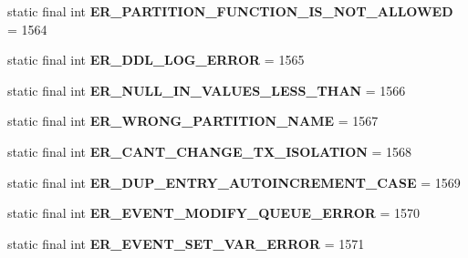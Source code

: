 \begin{DoxyCompactItemize}
static final int {\bfseries E\+R\+\_\+\+P\+A\+R\+T\+I\+T\+I\+O\+N\+\_\+\+F\+U\+N\+C\+T\+I\+O\+N\+\_\+\+I\+S\+\_\+\+N\+O\+T\+\_\+\+A\+L\+L\+O\+W\+ED} = 1564
\item 
\mbox{\label{classcom_1_1mysql_1_1jdbc_1_1_mysql_error_numbers_ae4eada3f8091c7c8cb28bda9799a93fe}} 
static final int {\bfseries E\+R\+\_\+\+D\+D\+L\+\_\+\+L\+O\+G\+\_\+\+E\+R\+R\+OR} = 1565
\item 
\mbox{\label{classcom_1_1mysql_1_1jdbc_1_1_mysql_error_numbers_a443c432772f886b0fbf8eeaf4c421483}} 
static final int {\bfseries E\+R\+\_\+\+N\+U\+L\+L\+\_\+\+I\+N\+\_\+\+V\+A\+L\+U\+E\+S\+\_\+\+L\+E\+S\+S\+\_\+\+T\+H\+AN} = 1566
\item 
\mbox{\label{classcom_1_1mysql_1_1jdbc_1_1_mysql_error_numbers_a599e0c2354340bb532eae2cf9669d602}} 
static final int {\bfseries E\+R\+\_\+\+W\+R\+O\+N\+G\+\_\+\+P\+A\+R\+T\+I\+T\+I\+O\+N\+\_\+\+N\+A\+ME} = 1567
\item 
\mbox{\label{classcom_1_1mysql_1_1jdbc_1_1_mysql_error_numbers_a033127b52316ee1d9003f134e933eae7}} 
static final int {\bfseries E\+R\+\_\+\+C\+A\+N\+T\+\_\+\+C\+H\+A\+N\+G\+E\+\_\+\+T\+X\+\_\+\+I\+S\+O\+L\+A\+T\+I\+ON} = 1568
\item 
\mbox{\label{classcom_1_1mysql_1_1jdbc_1_1_mysql_error_numbers_a6af6346fd168e3977d72199b4dae59c9}} 
static final int {\bfseries E\+R\+\_\+\+D\+U\+P\+\_\+\+E\+N\+T\+R\+Y\+\_\+\+A\+U\+T\+O\+I\+N\+C\+R\+E\+M\+E\+N\+T\+\_\+\+C\+A\+SE} = 1569
\item 
\mbox{\label{classcom_1_1mysql_1_1jdbc_1_1_mysql_error_numbers_a92595182bd0ec2d8ad023ae030f970b8}} 
static final int {\bfseries E\+R\+\_\+\+E\+V\+E\+N\+T\+\_\+\+M\+O\+D\+I\+F\+Y\+\_\+\+Q\+U\+E\+U\+E\+\_\+\+E\+R\+R\+OR} = 1570
\item 
\mbox{\label{classcom_1_1mysql_1_1jdbc_1_1_mysql_error_numbers_ab3e0294022bf3b35e4698465a94a6482}} 
static final int {\bfseries E\+R\+\_\+\+E\+V\+E\+N\+T\+\_\+\+S\+E\+T\+\_\+\+V\+A\+R\+\_\+\+E\+R\+R\+OR} = 1571

\end{DoxyCompactItemize}

